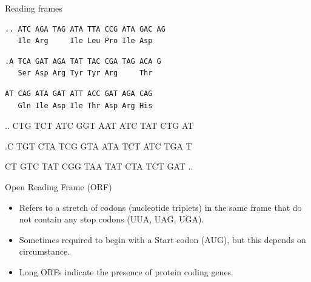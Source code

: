\documentclass[pdf]{beamer}
\begin{document}
\begin{frame}[fragile]{Reading frames}
{\begin{description}
\begin{verbatim}
.. ATC AGA TAG ATA TTA CCG ATA GAC AG
   Ile Arg     Ile Leu Pro Ile Asp  \end{verbatim}
    \item<3->[frame 2]
      \begin{verbatim} 
.A TCA GAT AGA TAT TAC CGA TAG ACA G  
   Ser Asp Arg Tyr Tyr Arg     Thr
\end{verbatim}
    \item<4->[frame 3]
      \begin{verbatim}
AT CAG ATA GAT ATT ACC GAT AGA CAG 
   Gln Ile Asp Ile Thr Asp Arg His
\end{verbatim}
    \item<5->[frame -1]
      \begin{semiverbatim} .. CTG TCT ATC GGT AAT ATC TAT CTG AT \end{semiverbatim}
    \item<5->[frame -2]
      \begin{semiverbatim} .C TGT CTA TCG GTA ATA TCT ATC TGA T \end{semiverbatim}
    \item<5->[frame -3]
      \begin{semiverbatim} CT GTC TAT CGG TAA TAT CTA TCT GAT .. \end{semiverbatim}
  \end{description}
}
\end{frame}

\begin{frame}{Open Reading Frame (ORF)}
  \begin{itemize}
    \item Refers to a stretch of codons (nucleotide triplets) in the same frame that
      do not contain any stop codons (UUA, UAG, UGA).
    \item Sometimes required to begin with a Start codon (AUG), but this depends on circumstance.
    \item Long ORFs indicate the presence of protein coding genes.
  \end{itemize}
\end{frame}
\end{document}
